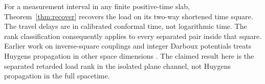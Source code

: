 For a measurement interval in any finite positive-time slab, Theorem~\ref{thm:recover} recovers the load on its two-way shortened time square. The travel delays are in calibrated conformal time, not logarithmic time. The rank classification consequently applies to every separated pair inside that square. Earlier work on inverse-square couplings and integer Darboux potentials treats Huygens propagation in other space dimensions \cite{BL}. The claimed result here is the separated retarded load rank in the isolated plane channel, not Huygens propagation in the full spacetime.
